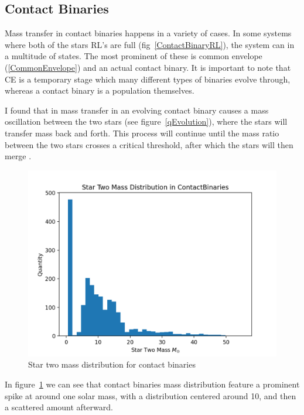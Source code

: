 \documentclass[12pt, a4paper]{article}
\begin{document}
        \subsection{Contact Binaries}
            Mass transfer in contact binaries happens in a variety of cases. In some systems where both of the stars RL's are full (fig~\ref{ContactBinaryRL}), the system can in a multitude of states. The most prominent of these is common envelope (\ref{CommonEnvelope}) and an actual contact binary. It is important to note that CE is a temporary stage which many different types of binaries evolve through, whereas a contact binary is a population themselves.

            I found that in mass transfer in an evolving contact binary causes a mass oscillation between the two stars \parencite{Fabry_2025} (see figure~\ref{qEvolution}), where the stars will transfer mass back and forth. This process will continue until the mass ratio between the two stars crosses a critical threshold, after which the stars will then merge \parencite{Fabry_2025}. 

        \begin{figure}[H]
            \centering
            \includegraphics[width = .8\textwidth]{figs/GeneratedFigs/W_UMa/ContactBinaries_Star_Two_Mass_Distribution.png}
            \caption{Star two mass distribution for contact binaries}
            \label{contactBinaryStar2MassDistro}
        \end{figure}

        In figure~\ref{contactBinaryStar2MassDistro} we can see that contact binaries mass distribution feature a prominent spike at around one solar mass, with a distribution centered around 10, and then a scattered amount afterward. 
\end{document}
